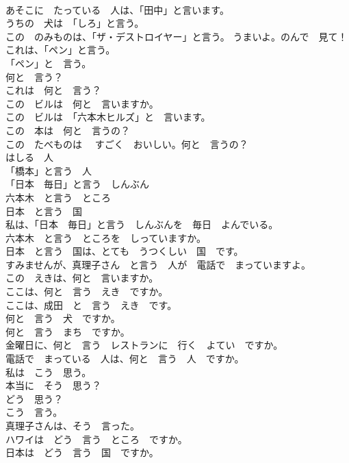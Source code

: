 \documentclass[8pt]{extreport}
\begin{document}
\begin{CJK}{UTF8}{min}
\\	あそこに　たっている　人は、「田中」と言います。	
\\	うちの　犬は　「しろ」と言う。	
\\	この　のみものは、「ザ・デストロイヤー」と言う。 うまいよ。のんで　見て！	
\\	これは、「ペン」と言う。	
\\	「ペン」と　言う。	
\\	何と　言う？	
\\	これは　何と　言う？	
\\	この　ビルは　何と　言いますか。	
\\	この　ビルは　「六本木ヒルズ」と　言います。	
\\	この　本は　何と　言うの？	
\\	この　たべものは 　すごく　おいしい。何と　言うの？	
\\	はしる　人	
\\	「橋本」と言う　人	
\\	「日本　毎日」と言う　しんぶん	
\\	六本木　と言う　ところ	
\\	日本　と言う　国	
\\	私は、「日本　毎日」と言う　しんぶんを　毎日　よんでいる。	
\\	六本木　と言う　ところを　しっていますか。	
\\	日本　と言う　国は、とても　うつくしい　国　です。	
\\	すみませんが、真理子さん　と言う　人が　電話で　まっていますよ。	
\\	この　えきは、何と　言いますか。	
\\	ここは、何と　言う　えき　ですか。	
\\	ここは、成田　と　言う　えき　です。	
\\	何と　言う　犬　ですか。	
\\	何と　言う　まち　ですか。	
\\	金曜日に、何と　言う　レストランに　行く　よてい　ですか。	
\\	電話で　まっている　人は、何と　言う　人　ですか。	
\\	私は　こう　思う。	
\\	本当に　そう　思う？	
\\	どう　思う？	
\\	こう　言う。	
\\	真理子さんは、そう　言った。	
\\	ハワイは　どう　言う　ところ　ですか。	
\\	日本は　どう　言う　国　ですか。	

\end{CJK}
\end{document}
